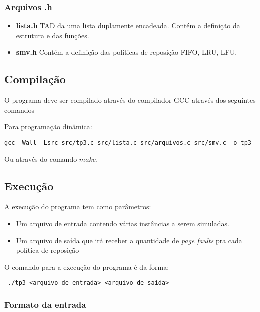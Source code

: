 \documentclass[12pt]{article}
\begin{document}
\subsubsection{Arquivos .h}

\begin{itemize}
\item \textbf{lista.h} TAD da uma lista duplamente encadeada. Contém a definição da estrutura e das funções.
\item \textbf{smv.h} Contém a definição das políticas de reposição FIFO, LRU, LFU.
\end{itemize}

\subsection{Compilação}

O programa deve ser compilado através do compilador GCC através dos seguintes comandos

Para programação dinâmica:
\begin{footnotesize}
\begin{verbatim}
gcc -Wall -Lsrc src/tp3.c src/lista.c src/arquivos.c src/smv.c -o tp3 \end{verbatim}
\end{footnotesize}

Ou através do comando $make$.

\subsection{Execução}

A execução do programa tem como parâmetros:
\begin{itemize}
\item Um arquivo de entrada contendo várias instâncias a serem simuladas.
\item Um arquivo de saída que irá receber a quantidade de \textit{page faults} pra cada política de reposição
\end{itemize}

O comando para a execução do programa é da forma:

\begin{footnotesize}
\begin{verbatim} ./tp3 <arquivo_de_entrada> <arquivo_de_saída>\end{verbatim}
\end{footnotesize}


\subsubsection{Formato da entrada}
\label{entrada}
\end{document}
